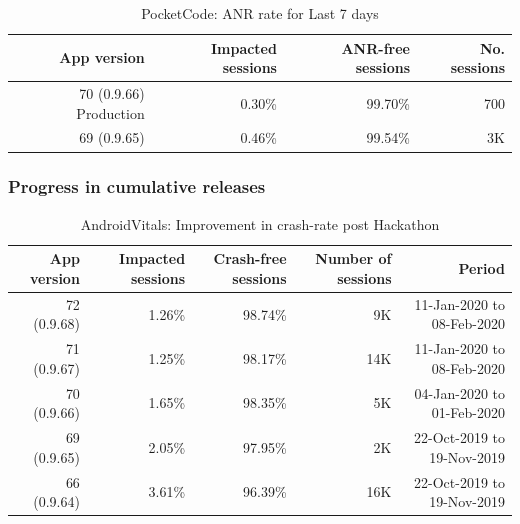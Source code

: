 \begin{table}[htbp!]
    \centering
    \footnotesize
    \begin{tabular}{r|r|r|r}
      App version  &Impacted sessions &ANR-free sessions &No. sessions \\
      \hline
      70 (0.9.66) Production &0.30\% &99.70\%	&~700 \\
      69 (0.9.65)            &0.46\% &99.54\%	&~3K  \\
    \end{tabular}
    \caption{PocketCode: ANR rate for Last 7 days}
    \label{tab:ANR_rate_24_to_29_Nov_2019}
\end{table}

\subsubsection{Progress in cumulative releases}


\begin{table}[htbp!]
    \centering
    \footnotesize
    \tabcolsep=0.06cm
    \begin{tabular}{r|r|r|r|r}
    \small
        App version &Impacted sessions &Crash-free sessions &Number of sessions &Period \\
        \hline
        72 (0.9.68) &1.26\% &   98.74\%     &~9K  &11-Jan-2020 to 08-Feb-2020 \\
        71 (0.9.67) &1.25\% &   98.17\%     &~14K &11-Jan-2020 to 08-Feb-2020 \\
        70 (0.9.66) &1.65\% &   98.35\%     &~5K  &04-Jan-2020 to 01-Feb-2020 \\
        69 (0.9.65) &2.05\% &	97.95\% 	&~2K  &22-Oct-2019 to 19-Nov-2019 \\
        \hline
        66 (0.9.64) &3.61\% &   96.39\% 	&~16K &22-Oct-2019 to 19-Nov-2019 \\
    \end{tabular}
    \caption{AndroidVitals: Improvement in crash-rate post Hackathon}
    \label{tab:androidvitals_crashrate_post_hackathon}
\end{table}

